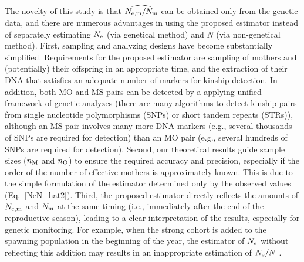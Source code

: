\documentclass[12pt, English]{article}
\begin{document}
\begin{spacing}{1.9}
The novelty of this study is that $\widehat{N_{\rm e,m}/N_{\rm m}}$ can be obtained only from the genetic data, and there are numerous advantages in using the proposed estimator instead of separately estimating $N_{\rm e}$ (via genetical method) and $N$ (via non-genetical method). First, sampling and analyzing designs have become substantially simplified. Requirements for the proposed estimator are sampling of mothers and (potentially) their offspring in an appropriate time, and the extraction of their DNA that satisfies an adequate number of markers for kinship detection. In addition, both MO and MS pairs can be detected by a applying unified framework of genetic analyzes (there are many algorithms to detect kinship pairs from single nucleotide polymorphisms (SNPs) or short tandem repeats (STRs)), although an MS pair involves many more DNA markers (e.g., several thousands of SNPs are required for detection) than an MO pair (e.g., several hundreds of SNPs are required for detection). Second, our theoretical results guide sample sizes ($n_{\rm M}$ and $n_{\rm O}$) to ensure the required accuracy and precision, especially if the order of the number of effective mothers is approximately known. This is due to the simple formulation of the estimator determined only by the observed values (Eq.~\ref{NeN_hat2}). Third, the proposed estimator directly reflects the amounts of $N_{\rm e,m}$ and $N_{\rm m}$ at the same timing (i.e., immediately after the end of the reproductive season), leading to a clear interpretation of the results, especially for genetic monitoring. For example, when the strong cohort is added to the spawning population in the beginning of the year, the estimator of $N_{\rm e}$ without reflecting this addition may results in an inappropriate estimation of $N_{\rm e}/N$ \cite[details of the temporal scale relevant to estimated $N_{\rm e}$ for each method were discussed in][]{Wang:2016aa}. 


\end{spacing}
\end{document}
